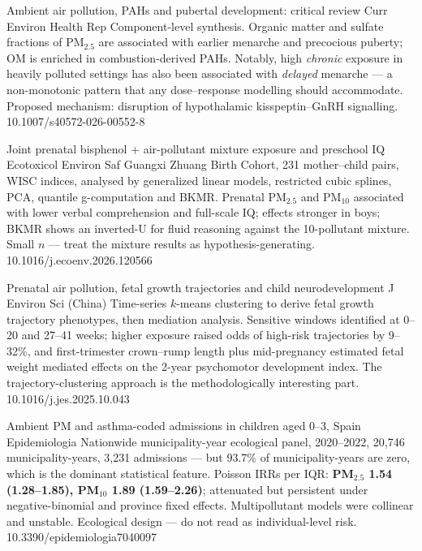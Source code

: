 \documentclass[10pt]{article}
\begin{document}
{Ambient air pollution, PAHs and pubertal development: critical review}
{Curr Environ Health Rep}
{Component-level synthesis. Organic matter and sulfate fractions of PM$_{2.5}$ are
associated with earlier menarche and precocious puberty; OM is enriched in
combustion-derived PAHs. Notably, high \emph{chronic} exposure in heavily polluted
settings has also been associated with \emph{delayed} menarche --- a non-monotonic pattern
that any dose--response modelling should accommodate. Proposed mechanism: disruption of
hypothalamic kisspeptin--GnRH signalling.}
{10.1007/s40572-026-00552-8}

{Joint prenatal bisphenol + air-pollutant mixture exposure and preschool IQ}
{Ecotoxicol Environ Saf}
{Guangxi Zhuang Birth Cohort, 231 mother--child pairs, WISC indices, analysed by
generalized linear models, restricted cubic splines, PCA, quantile g-computation and
BKMR. Prenatal PM$_{2.5}$ and PM$_{10}$ associated with lower verbal comprehension and
full-scale IQ; effects stronger in boys; BKMR shows an inverted-U for fluid reasoning
against the 10-pollutant mixture. Small $n$ --- treat the mixture results as
hypothesis-generating.}
{10.1016/j.ecoenv.2026.120566}

{Prenatal air pollution, fetal growth trajectories and child neurodevelopment}
{J Environ Sci (China)}
{Time-series $k$-means clustering to derive fetal growth trajectory phenotypes, then
mediation analysis. Sensitive windows identified at 0--20 and 27--41 weeks; higher
exposure raised odds of high-risk trajectories by 9--32\%, and first-trimester
crown--rump length plus mid-pregnancy estimated fetal weight mediated effects on the
2-year psychomotor development index. The trajectory-clustering approach is the
methodologically interesting part.}
{10.1016/j.jes.2025.10.043}

\clearpage


{Ambient PM and asthma-coded admissions in children aged 0--3, Spain}
{Epidemiologia}
{Nationwide municipality-year ecological panel, 2020--2022, 20{,}746 municipality-years,
3{,}231 admissions --- but 93.7\% of municipality-years are zero, which is the dominant
statistical feature. Poisson IRRs per IQR: \textbf{PM$_{2.5}$ 1.54 (1.28--1.85),
PM$_{10}$ 1.89 (1.59--2.26)}; attenuated but persistent under negative-binomial and
province fixed effects. Multipollutant models were collinear and unstable. Ecological
design --- do not read as individual-level risk.}
{10.3390/epidemiologia7040097}
\end{document}
